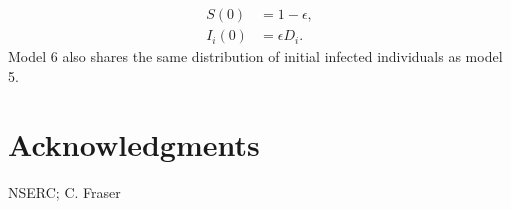 \documentclass[10pt,letterpaper]{article}
\begin{document}
\begin{equation}
\begin{aligned}
S(0) &= 1 - \epsilon,\\
I_i(0) &=  \epsilon D_i.
\end{aligned}
\end{equation}
Model 6 also shares the same distribution of initial infected individuals as model 5.

\section*{Acknowledgments}
NSERC; C. Fraser

\nolinenumbers

%
%
% 


\end{document}
